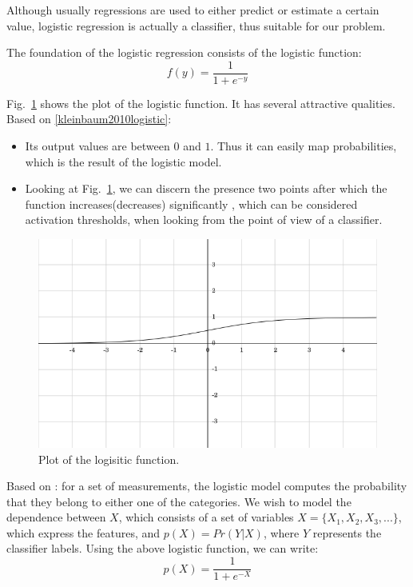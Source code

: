 Although usually regressions are used to either predict or estimate a certain value, logistic regression is actually a classifier, thus suitable for our problem. 

The foundation of the logistic regression consists of the logistic function:
\begin{equation*}
f(y) = \frac{1}{1+e^{-y}}
\end{equation*}

Fig.~\ref{pic:logit} shows the plot of the logistic function. It has several attractive qualities. Based on \ref{kleinbaum2010logistic}:

\begin{itemize}
  \item Its output values are between $0$ and $1$. Thus it can easily map probabilities, which is the result of the logistic model.
  \item Looking at Fig.~\ref{pic:logit}, we can discern the presence two points after which the function increases(decreases) significantly , which can be considered activation thresholds, when looking from the point of view of a classifier.  
\end{itemize}

\begin{figure}[h]
	\begin{center}
		\includegraphics[scale=0.5]{figures/logit.png}
	\end{center}
	
	\caption{Plot of the logisitic function.}
	\label{pic:logit}

\end{figure}

Based on \cite{kleinbaum2010logistic,logmodel,statistics}: for a set of measurements, the logistic model computes the probability that they belong to either one of the categories. We wish to model the dependence between $X$, which consists of a set of variables $X = \lbrace X_1,X_2,X_3,... \rbrace $, which express the features, and $p(X) = Pr(Y \vert X)$, where $Y$ represents the classifier labels. Using the above logistic function, we can write:
\begin{equation*}
p(X) = \frac{1}{1+e^{-X}}
\end{equation*}

